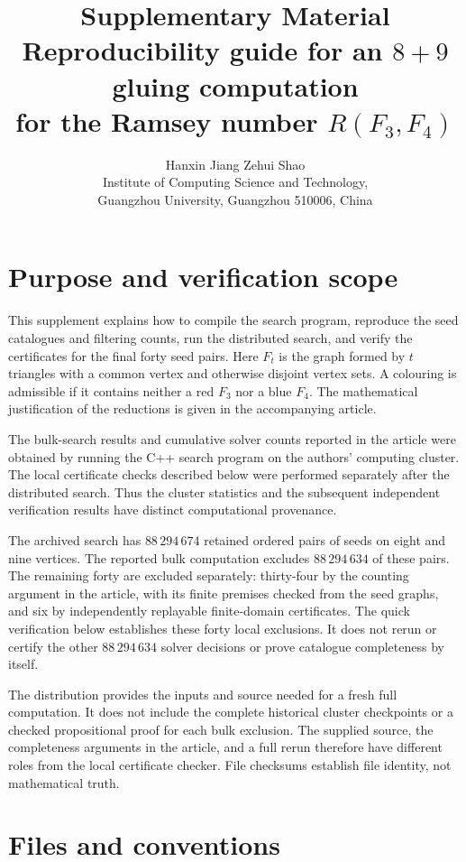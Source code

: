 \documentclass[11pt]{article}
\title{Supplementary Material\\[0.4em]
\large Reproducibility guide for an $8+9$ gluing computation\\
for the Ramsey number $R(F_3,F_4)$}
\author{Hanxin Jiang \quad Zehui Shao\\[0.4em]
\small Institute of Computing Science and Technology,\\
\small Guangzhou University, Guangzhou 510006, China}
\date{}
\begin{document}
\maketitle

\section{Purpose and verification scope}

This supplement explains how to compile the search program, reproduce the
seed catalogues and filtering counts, run the distributed search, and verify
the certificates for the final forty seed pairs. Here $F_t$ is the graph
formed by $t$ triangles with a common vertex and otherwise disjoint vertex
sets. A colouring is admissible if it contains neither a red $F_3$ nor a blue
$F_4$. The mathematical justification of the reductions is given in the
accompanying article.

The bulk-search results and cumulative solver counts reported in the
article were obtained by running the C++ search program on the authors'
computing cluster. The local certificate checks described below were
performed separately after the distributed search. Thus the cluster
statistics and the subsequent independent verification results have
distinct computational provenance.

The archived search has $88\,294\,674$ retained ordered pairs of seeds on
eight and nine vertices. The reported bulk computation excludes
$88\,294\,634$ of these pairs. The remaining forty are excluded separately:
thirty-four by the counting argument in the article, with its finite
premises checked from the seed graphs, and six by independently replayable
finite-domain certificates. The quick verification below establishes these
forty local exclusions. It does not rerun or certify the other
$88\,294\,634$ solver decisions or prove catalogue completeness by itself.

The distribution provides the inputs and source needed for a fresh full
computation. It does not include the complete historical cluster
checkpoints or a checked propositional proof for each bulk exclusion.
The supplied source, the completeness arguments in the article, and a
full rerun therefore have different roles from the local certificate
checker. File checksums establish file identity, not mathematical truth.

\section{Files and conventions}
\end{document}
